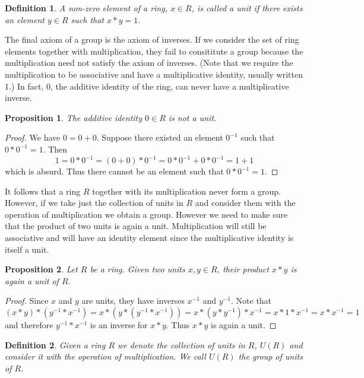 \documentclass{article}
\theoremstyle{problemstyle}
\newtheorem{proposition}{Proposition}
\newtheorem{definition}{Definition}
\begin{document}
\begin{definition}
A non-zero element of a ring, $x \in R$, is called a unit if there exists an element $y \in R$ such that $x*y = 1$. 
\end{definition}

The final axiom of a group is the axiom of inverses. If we consider the set of ring elements together with multiplication, they fail to consititute a group because the multiplication need not satisfy the axiom of inverses. (Note that we require the multiplication to be associative and have a multiplicative identity, usually written 1.) In fact, $0$, the additive identity of the ring, can never have a multiplicative inverse. 

\begin{proposition}
The additive identity $0 \in R$ is not a unit. 
\end{proposition}

\begin{proof}
We have $0 = 0 + 0$. Suppose there existed an element $0^{-1}$ such that $0*0^{-1} = 1$. Then  $$1 = 0*0^{-1}= (0 + 0)*0^{-1} = 0*0^{-1} + 0*0^{-1} = 1 + 1$$ which is absurd. Thus there cannot be an element such that  $0*0^{-1} = 1$. 
\end{proof}

It follows that a ring $R$ together with its multiplication never form a group. However, if we take just the collection of units in $R$ and consider them with the operation of multiplication we obtain a group. However we need to make sure that the product of two units is again a unit. Multiplication will still be associative and will have an identity element since the multiplicative identity is itself a unit. 

\begin{proposition}
Let $R$ be a ring. Given two units $x,y \in R$, their product $x*y$ is again a unit of $R$. 
\end{proposition}

\begin{proof}
Since $x$ and $y$ are units, they have inverses $x^{-1}$ and $y^{-1}$. Note that $$(x*y)*(y^{-1}*x^{-1}) = x*(y*(y^{-1}*x^{-1})) = x*(y*y^{-1})*x^{-1} = x*1*x^{-1} = x*x^{-1} = 1$$ and therefore $y^{-1}*x^{-1}$ is an inverse for $x*y$. Thus $x*y$ is again a unit. 
\end{proof}

\begin{definition}
Given a ring $R$ we denote the collection of units in $R$, $U(R)$ and consider it with the operation of multiplication. We call $U(R)$ the group of units of $R$. 
\end{definition}
\end{document}
